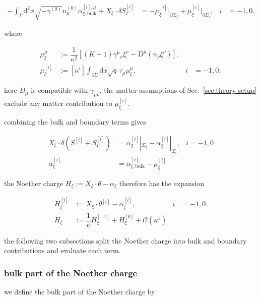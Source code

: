 \begin{align}
-\int _{\Gamma}\mathrm{d}^{2}x\sqrt{ -\gamma ^{(0)} }n_{\mu}^{(0)}\alpha _{\xi,\mathrm{bulk}}^{[i],\mu}+X_{\xi}\mathbin{\cdot}\delta S_{\Gamma}^{[i]} &=-\mu _{\xi}^{[i]}\big|_{\partial\Sigma _{f}}+\mu _{\xi}^{[i]}\big|_{\partial\Sigma _{i}}, & i&=-1,0.
\end{align}

where

\[\begin{aligned}
\mu _{\xi}^{\mu} &:=\dfrac{1}{\kappa ^{2}}\left[(K-1)\gamma ^{\mu}{}_{\nu}\xi ^{\nu}-D^{\mu}(n_{\nu}\xi ^{\nu})\right], \\
\mu _{\xi}^{[i]} &:=\left[\kappa ^{i}\right]\int _{\partial\Sigma}\mathrm{d}x\sqrt{q}\,\tau _{\mu}\mu _{\xi}^{\mu}, & i&=-1,0,
\end{aligned}\]

here $\displaystyle{D_{\mu}}$ is compatible with $\displaystyle{\gamma _{\mu\nu}}$. the matter assumptions of Sec.~\ref{sec:theory-setup} exclude any matter contribution to $\displaystyle{\mu _{\xi}^{[i]}}$.

combining the bulk and boundary terms gives

\begin{align}
X_{\xi}\cdot \delta (S^{[i]}+S_{\Gamma}^{[i]}) & =\alpha _{\xi}^{[i]}|_{\Sigma _{f}}-\alpha _{\xi}^{[i]}|_{\Sigma _{i}}, & i=-1,0 \\
\alpha _{\xi}^{[i]} & =\alpha _{\xi,\text{bulk}}^{[i]}-\mu _{\xi}^{[i]}
\end{align}

the Noether charge $\displaystyle{H_{\xi}:=X_{\xi}\cdot\theta-\alpha _{\xi}}$ therefore has the expansion

\[\begin{aligned}
H_{\xi}^{[i]} & :=X_{\xi}\mathbin{\cdot}\theta ^{[i]}-\alpha _{\xi}^{[i]}, & i & =-1,0. \\
H_{\xi} & := \dfrac{1}{\kappa}H_{\xi}^{[-1]}+H_{\xi}^{[0]}+\mathcal{O}(\kappa ^{1})
\end{aligned}\]

the following two subsections split the Noether charge into bulk and boundary contributions and evaluate each term.

\subsubsection{bulk part of the Noether charge}\label{subsubsec:bulk-noether-charge}

we define the bulk part of the Noether charge by

